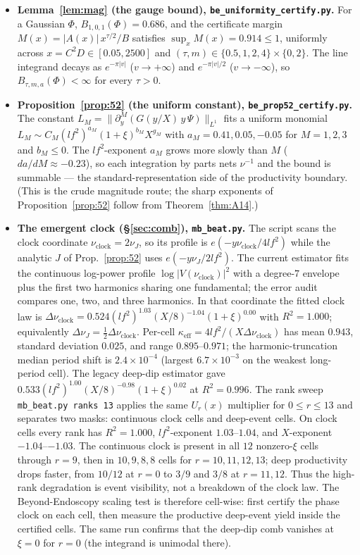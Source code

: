 \documentclass[11pt]{article}
\theoremstyle{definition}
\begin{document}
\begin{itemize}
\item \textbf{Lemma~\ref{lem:mag} (the gauge bound), \texttt{be\_uniformity\_certify.py}.} For a
Gaussian $\Phi$, $B_{1,0,1}(\Phi)=0.686$, and the certificate margin
$M(x)=|A(x)|\,x^{\tau/2}/B$ satisfies $\sup_x M(x)=0.914\le1$, uniformly across $x=C^2D\in[0.05,2500]$
and $(\tau,m)\in\{0.5,1,2,4\}\times\{0,2\}$. The line integrand decays as $e^{-\pi|v|}$ ($v\to+\infty$)
and $e^{-\pi|v|/2}$ ($v\to-\infty$), so $B_{\tau,m,a}(\Phi)<\infty$ for every $\tau>0$.

\item \textbf{Proposition~\ref{prop:52} (the uniform constant), \texttt{be\_prop52\_certify.py}.} The
constant $L_M=\|\partial_y^M(G(y/X)\,y\,\Psi)\|_{L^1}$ fits a uniform monomial
$L_M\sim C_M(lf^2)^{a_M}(1+\xi)^{b_M}X^{g_M}$ with $a_M=0.41,0.05,-0.05$ for $M=1,2,3$ and $b_M\le0$.
The $lf^2$-exponent $a_M$ grows more slowly than $M$ ($da/dM\approx-0.23$), so each integration by
parts nets $\nu^{-1}$ and the bound is summable --- the standard-representation side of the
productivity boundary. (This is the crude magnitude route; the sharp exponents of
Proposition~\ref{prop:52} follow from Theorem~\ref{thm:A14}.)

\item \textbf{The emergent clock (\S\ref{sec:comb}), \texttt{mb\_beat.py}.} The script scans the clock
coordinate $\nu_{\mathrm{clock}}=2\nu_J$, so its profile is
$e(-y\nu_{\mathrm{clock}}/4lf^2)$ while the analytic $J$ of Prop.~\ref{prop:52} uses
$e(-y\nu_J/2lf^2)$. The current estimator fits the continuous log-power profile
$\log|V(\nu_{\mathrm{clock}})|^2$ with a degree-$7$ envelope plus the first two harmonics sharing one
fundamental; the error audit compares one, two, and three harmonics. In that coordinate the fitted
clock law is
$\Delta\nu_{\mathrm{clock}}=0.524(lf^2)^{1.03}(X/8)^{-1.04}(1+\xi)^{0.00}$ with $R^2=1.000$; equivalently
$\Delta\nu_J=\tfrac12\Delta\nu_{\mathrm{clock}}$. Per-cell
$\kappa_{\mathrm{eff}}=4lf^2/(X\Delta\nu_{\mathrm{clock}})$ has mean $0.943$, standard deviation $0.025$,
and range $0.895$--$0.971$; the harmonic-truncation median period shift is $2.4\times10^{-4}$ (largest
$6.7\times10^{-3}$ on the weakest long-period cell). The legacy deep-dip estimator gave
$0.533(lf^2)^{1.00}(X/8)^{-0.98}(1+\xi)^{0.02}$ at $R^2=0.996$. The rank sweep
\texttt{mb\_beat.py ranks 13} applies the same $U_r(x)$ multiplier for $0\le r\le13$ and separates two masks:
continuous clock cells and deep-event cells. On clock cells every rank has $R^2=1.000$, $lf^2$-exponent
$1.03$--$1.04$, and $X$-exponent $-1.04$--$-1.03$. The continuous clock is present in all $12$ nonzero-$\xi$
cells through $r=9$, then in $10,9,8,8$ cells for $r=10,11,12,13$; deep productivity drops faster, from
$10/12$ at $r=0$ to $3/9$ and $3/8$ at $r=11,12$. Thus the high-rank degradation is event visibility, not a
breakdown of the clock law. The Beyond-Endoscopy scaling test is therefore cell-wise: first certify the
phase clock on each cell, then measure the productive deep-event yield inside the certified cells. The same run confirms that the deep-dip comb vanishes at $\xi=0$ for $r=0$
(the integrand is unimodal there).


\end{itemize}
\end{document}
